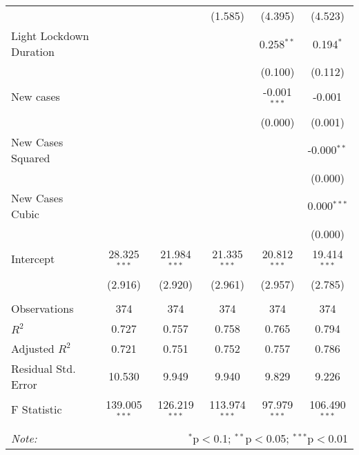 \begin{tabular}{@{\extracolsep{5pt}}lccccc}
  & & & (1.585) & (4.395) & (4.523) \\
 Light Lockdown Duration & & & & 0.258$^{**}$ & 0.194$^{*}$ \\
  & & & & (0.100) & (0.112) \\
 New cases & & & & -0.001$^{***}$ & -0.001$^{}$ \\
  & & & & (0.000) & (0.001) \\
 New Cases Squared & & & & & -0.000$^{**}$ \\
  & & & & & (0.000) \\
 New Cases Cubic & & & & & 0.000$^{***}$ \\
  & & & & & (0.000) \\
 Intercept & 28.325$^{***}$ & 21.984$^{***}$ & 21.335$^{***}$ & 20.812$^{***}$ & 19.414$^{***}$ \\
  & (2.916) & (2.920) & (2.961) & (2.957) & (2.785) \\
\hline \\[-1.8ex]
 Observations & 374 & 374 & 374 & 374 & 374 \\
 $R^2$ & 0.727 & 0.757 & 0.758 & 0.765 & 0.794 \\
 Adjusted $R^2$ & 0.721 & 0.751 & 0.752 & 0.757 & 0.786 \\
 Residual Std. Error & 10.530 & 9.949 & 9.940 & 9.829 & 9.226  \\
 F Statistic & 139.005$^{***}$  & 126.219$^{***}$  & 113.974$^{***}$  & 97.979$^{***}$  & 106.490$^{***}$  \\
\hline
\hline \\[-1.8ex]
\textit{Note:} & \multicolumn{5}{r}{$^{*}$p$<$0.1; $^{**}$p$<$0.05; $^{***}$p$<$0.01} \\
\end{tabular}
